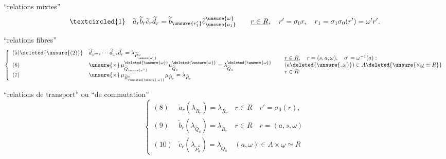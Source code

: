 
``relations mixtes''
\[
\textcircled{1}\quad
\widetilde a_r\widetilde b_r\widetilde c_r\widetilde d_r
=\widetilde b_{\unsure{r_1'}}\widetilde c_{\unsure{a_1}}^{\unsure{\omega}}
\qquad
\underline{r\in R},\quad r'=\sigma_0r,\quad
r_1=\sigma_1\sigma_0(r')=\omega'r'.
\]

``relations fibres''
\[
\left\{\begin{array}{ll}
(5)\deleted{\unsure{(2)}}&\widetilde d_{\omega^m r}\cdots\widetilde d_{\omega r}\widetilde d_r=\lambda_{\widetilde P_{\unsure{a'_1}}^\omega}\\
(6)&\unsure{\times}\,\mu_{\widetilde Q_{\unsure{a^\vee}}}^{\deleted{\unsure{\omega}}}\mu_{\widetilde Q_a}^{\deleted{\unsure{\omega}}}=\lambda_{\widetilde Q_a}^{\deleted{\unsure{\omega}}}\\
(7)&\unsure{\times}\,\mu_{\widetilde R_{r\deleted{\unsure{,\omega}}}^\vee}\mu_{\widetilde R_r}=\lambda_{\widetilde R_r}
\end{array}\right.
\quad
\begin{array}{l}
\underline{r\in R},\quad r=(s,a,\omega),\quad a'=\omega^{-1}(a):\\
(a\deleted{\unsure{,\omega}})\in A\deleted{\unsure{\times\underline\omega\simeq R}}\\
r\in R
\end{array}
\]

``relations de transport'' ou ``de commutation''
\[
\left\{\begin{array}{lll}
(8)&\widetilde a_r(\lambda_{\widetilde R_r})=\lambda_{\widetilde R_{r'}}&r\in R\quad r'=\sigma_0(r),\\
(9)&\widetilde b_r(\lambda_{\widetilde Q_a})=\lambda_{\widetilde R_r}&r\in R\quad r=(a,s,\omega)\\
(10)&\widetilde c_r(\lambda_{\widetilde P_a^\omega})=\lambda_{\widetilde Q_a}&(a,\omega)\in A\times\underline\omega\simeq R
\end{array}\right.
\]
